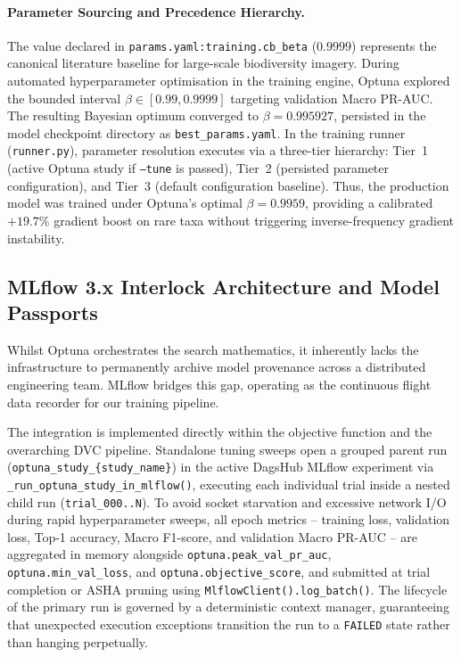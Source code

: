 \paragraph{Parameter Sourcing and Precedence Hierarchy.}
The value declared in \nolinkurl{params.yaml:training.cb_beta} ($0.9999$) represents the canonical literature baseline for large-scale biodiversity imagery. During automated hyperparameter optimisation in the training engine, Optuna explored the bounded interval $\beta \in [0.99, 0.9999]$ targeting validation Macro PR-AUC. The resulting Bayesian optimum converged to $\beta = 0.995927$, persisted in the model checkpoint directory as \texttt{best\_params.yaml}. In the training runner (\texttt{runner.py}), parameter resolution executes via a three-tier hierarchy: Tier~1 (active Optuna study if \texttt{--tune} is passed), Tier~2 (persisted parameter configuration), and Tier~3 (default configuration baseline). Thus, the production model was trained under Optuna's optimal $\beta = 0.9959$, providing a calibrated $+19.7\%$ gradient boost on rare taxa without triggering inverse-frequency gradient instability.

\subsection{MLflow 3.x Interlock Architecture and Model Passports}

Whilst Optuna orchestrates the search mathematics, it inherently lacks the infrastructure to permanently archive model provenance across a distributed engineering team. MLflow bridges this gap, operating as the continuous flight data recorder for our training pipeline.

The integration is implemented directly within the objective function and the overarching DVC pipeline. Standalone tuning sweeps open a grouped parent run (\nolinkurl{optuna_study_{study_name}}) in the active DagsHub MLflow experiment via \nolinkurl{_run_optuna_study_in_mlflow()}, executing each individual trial inside a nested child run (\nolinkurl{trial_000..N}). To avoid socket starvation and excessive network I/O during rapid hyperparameter sweeps, all epoch metrics -- training loss, validation loss, Top-1 accuracy, Macro F1-score, and validation Macro PR-AUC -- are aggregated in memory alongside \nolinkurl{optuna.peak_val_pr_auc}, \nolinkurl{optuna.min_val_loss}, and \nolinkurl{optuna.objective_score}, and submitted at trial completion or ASHA pruning using \texttt{MlflowClient().log\_batch()}. The lifecycle of the primary run is governed by a deterministic context manager, guaranteeing that unexpected execution exceptions transition the run to a \texttt{FAILED} state rather than hanging perpetually.

